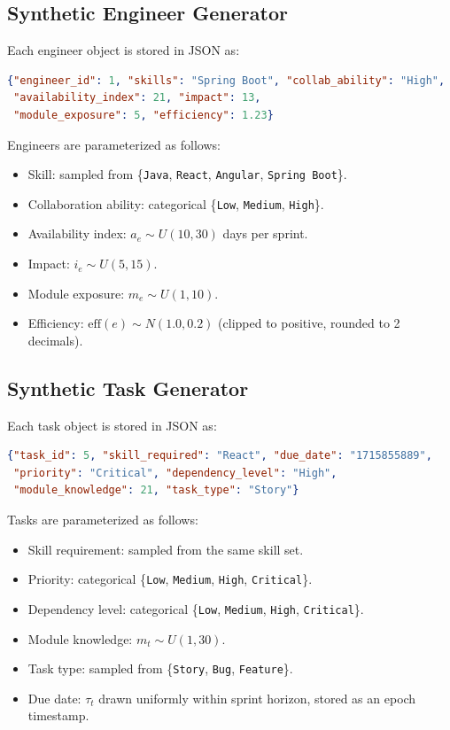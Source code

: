 \documentclass[journal]{IEEEtran}
\begin{document}
\subsection{Synthetic Engineer Generator}
Each engineer object is stored in JSON as:
\begin{lstlisting}[language=json]
{"engineer_id": 1, "skills": "Spring Boot", "collab_ability": "High",
 "availability_index": 21, "impact": 13,
 "module_exposure": 5, "efficiency": 1.23}
\end{lstlisting}

Engineers are parameterized as follows:
\begin{itemize}[leftmargin=*]
    \item Skill: sampled from \{\texttt{Java}, \texttt{React}, \texttt{Angular}, \texttt{Spring Boot}\}.
    \item Collaboration ability: categorical \{\texttt{Low}, \texttt{Medium}, \texttt{High}\}.
    \item Availability index: $a_e \sim U(10,30)$ days per sprint.
    \item Impact: $i_e \sim U(5,15)$.
    \item Module exposure: $m_e \sim U(1,10)$.
    \item Efficiency: $\mathrm{eff}(e) \sim N(1.0,0.2)$ (clipped to positive, rounded to 2 decimals).
\end{itemize}

\subsection{Synthetic Task Generator}
Each task object is stored in JSON as:
\begin{lstlisting}[language=json]
{"task_id": 5, "skill_required": "React", "due_date": "1715855889",
 "priority": "Critical", "dependency_level": "High",
 "module_knowledge": 21, "task_type": "Story"}
\end{lstlisting}

Tasks are parameterized as follows:
\begin{itemize}[leftmargin=*]
    \item Skill requirement: sampled from the same skill set.
    \item Priority: categorical \{\texttt{Low}, \texttt{Medium}, \texttt{High}, \texttt{Critical}\}.
    \item Dependency level: categorical \{\texttt{Low}, \texttt{Medium}, \texttt{High}, \texttt{Critical}\}.
    \item Module knowledge: $m_t \sim U(1,30)$.
    \item Task type: sampled from \{\texttt{Story}, \texttt{Bug}, \texttt{Feature}\}.
    \item Due date: $\tau_t$ drawn uniformly within sprint horizon, stored as an epoch timestamp.
\end{itemize}
\end{document}
